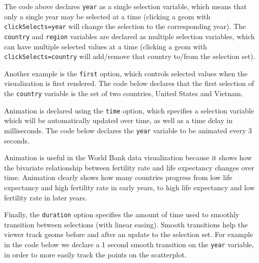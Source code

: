 \documentclass[12pt,]{article}
\newenvironment{Shaded}{\begin{snugshade}}{\end{snugshade}}
\newcommand{\DataTypeTok}[1]{\textcolor[rgb]{0.13,0.29,0.53}{#1}}
\newcommand{\DecValTok}[1]{\textcolor[rgb]{0.00,0.00,0.81}{#1}}
\newcommand{\KeywordTok}[1]{\textcolor[rgb]{0.13,0.29,0.53}{\textbf{#1}}}
\newcommand{\NormalTok}[1]{#1}
\newcommand{\OperatorTok}[1]{\textcolor[rgb]{0.81,0.36,0.00}{\textbf{#1}}}
\newcommand{\StringTok}[1]{\textcolor[rgb]{0.31,0.60,0.02}{#1}}
\theoremstyle{definition}
\theoremstyle{definition}
\theoremstyle{definition}
\theoremstyle{remark}
\begin{document}
The code above declares \texttt{year} as a single selection variable,
which means that only a single year may be selected at a time (clicking
a geom with \texttt{clickSelects=year} will change the selection to the
corresponding year). The \texttt{country} and \texttt{region} variables
are declared as multiple selection variables, which can have multiple
selected values at a time (clicking a geom with
\texttt{clickSelects=country} will add/remove that country to/from the
selection set).

Another example is the \texttt{first} option, which controls selected
values when the visualization is first rendered. The code below declares
that the first selection of the \texttt{country} variable is the set of
two countries, United States and Vietnam.

\begin{Shaded}
\end{Shaded}

Animation is declared using the \texttt{time} option, which specifies a
selection variable which will be automatically updated over time, as
well as a time delay in milliseconds. The code below declares the
\texttt{year} variable to be animated every 3 seconds.

\begin{Shaded}
\end{Shaded}

Animation is useful in the World Bank data visualization because it
shows how the bivariate relationship between fertility rate and life
expectancy changes over time. Animation clearly shows how many countries
progress from low life expectancy and high fertility rate in early
years, to high life expectancy and low fertility rate in later years.

Finally, the \texttt{duration} option specifies the amount of time used
to smoothly transition between selections (with linear easing). Smooth
transitions help the viewer track geoms before and after an update to
the selection set. For example in the code below we declare a 1 second
smooth transition on the \texttt{year} variable, in order to more easily
track the points on the scatterplot.
\end{document}
